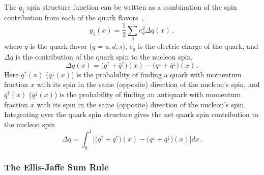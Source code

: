   The $g_1$ spin structure function can be written as a combination of the spin
  contribution from each of the quark flavors~\cite{Bass:2007zzb},
  \begin{equation}
    g_1(x) = \frac{1}{2}\sum_q e_q^2 \Delta q(x) \,,
  \end{equation}
  where $q$ is the quark flavor ($q = u,d,s$), $e_q$ is the electric charge of
  the quark, and $\Delta q$ is the contribution of the quark spin to the
  nucleon spin,
  \begin{equation}
    \Delta q(x) = \big(q^{\uparrow} + \bar{q}^{\uparrow}\big)(x) 
      - \big(q^{\downarrow} + \bar{q}^{\downarrow}\big)(x) \,.
  \end{equation}
  Here $q^{\uparrow}(x)$ \big($q^{\downarrow}(x)$\big) is the probability of
  finding a quark with momentum fraction $x$ with its spin in the same
  (opposite) direction of the nucleon's spin, and $\bar{q}^{\uparrow}(x)$
  \big($\bar{q}^{\downarrow}(x)$\big) is the probability of finding an
  antiquark with momentum fraction $x$ with its spin in the same (opposite)
  direction of the nucleon's spin. Integrating over the quark spin structure
  gives the net quark spin contribution to the nucleon spin
  \begin{equation}
    \Delta q = \int_0^1 \Big[\big(q^{\uparrow} + \bar{q}^{\uparrow}\big)(x)
      - \big(q^{\downarrow} + \bar{q}^{\downarrow}\big)(x) \Big] dx \,.
  \end{equation}

  \subsubsection{The Ellis-Jaffe Sum Rule}

